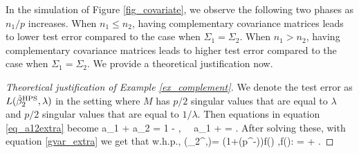 \iffalse
 
In the simulation of Figure \ref{fig_covariate}, we observe the following two phases as  $n_1 / p$ increases.
When $n_1 \le n_2$, having complementary covariance matrices leads to lower test error compared to the case when $\Sigma_1 = \Sigma_2$.
When $n_1 > n_2$, having complementary covariance matrices leads to higher test error compared to the case when $\Sigma_1 = \Sigma_2$.
We provide a theoretical justification now.

\begin{proof}[Theoretical justification of Example \ref{ex_complement}]
We denote the test error as $L(\hat \beta_{2}^{\textup{HPS}},\lambda)$ in the setting where $M$ has $p/2$ singular values that are equal to $\lambda$ and $p/2$ singular values that are equal to $1 / \lambda$. Then equations in equation \eqref{eq_a12extra} become
\be\label{compleeq} a_1 + a_2 = 1 - ,  \ \ a_1 + \cdot {} = . \ee
After solving these, with equation \eqref{gvar_extra} we get that w.h.p.,
\be\label{testcomple}
 \te(\hat \beta_{2}^{\MTL},\lambda)= (1+\OO(p^{-\e}))\cdot f(\lambda) ,\quad f(\lambda): =  + .\ee



\end{proof}
